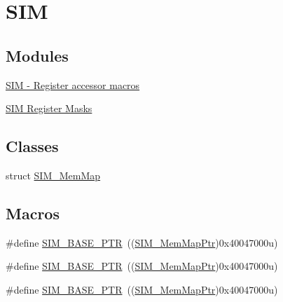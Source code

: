 \hypertarget{group___s_i_m___peripheral}{}\section{S\+IM}
\label{group___s_i_m___peripheral}
\subsection*{Modules}
\begin{DoxyCompactItemize}
\item 
\hyperlink{group___s_i_m___register___accessor___macros}{S\+I\+M -\/ Register accessor macros}
\item 
\hyperlink{group___s_i_m___register___masks}{S\+I\+M Register Masks}
\end{DoxyCompactItemize}
\subsection*{Classes}
\begin{DoxyCompactItemize}
\item 
struct \hyperlink{struct_s_i_m___mem_map}{S\+I\+M\+\_\+\+Mem\+Map}
\end{DoxyCompactItemize}
\subsection*{Macros}
\begin{DoxyCompactItemize}
\item 
\#define \hyperlink{group___s_i_m___peripheral_ga719ec5df95fbb5732438f794f2cccf3c}{S\+I\+M\+\_\+\+B\+A\+S\+E\+\_\+\+P\+TR}~((\hyperlink{group___s_i_m___peripheral_ga708a122e8ca55082e0cf67cab6a77d02}{S\+I\+M\+\_\+\+Mem\+Map\+Ptr})0x40047000u)
\item 
\#define \hyperlink{group___s_i_m___peripheral_ga719ec5df95fbb5732438f794f2cccf3c}{S\+I\+M\+\_\+\+B\+A\+S\+E\+\_\+\+P\+TR}~((\hyperlink{group___s_i_m___peripheral_ga708a122e8ca55082e0cf67cab6a77d02}{S\+I\+M\+\_\+\+Mem\+Map\+Ptr})0x40047000u)
\item 
\#define \hyperlink{group___s_i_m___peripheral_ga719ec5df95fbb5732438f794f2cccf3c}{S\+I\+M\+\_\+\+B\+A\+S\+E\+\_\+\+P\+TR}~((\hyperlink{group___s_i_m___peripheral_ga708a122e8ca55082e0cf67cab6a77d02}{S\+I\+M\+\_\+\+Mem\+Map\+Ptr})0x40047000u)
\end{DoxyCompactItemize}

